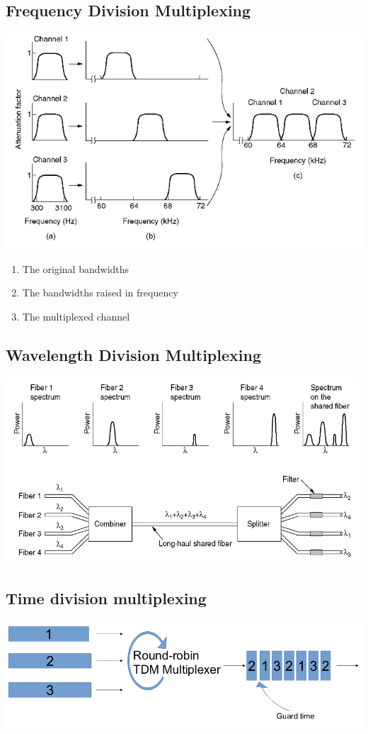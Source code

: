 \documentclass{article}[18pt]
\begin{document}
\subsection{Frequency Division Multiplexing}
\begin{center}
	\includegraphics[scale=0.7]{FDM}
\end{center}
\begin{enumerate}[label=\alph*]
	\item The original bandwidths
	\item The bandwidths raised in frequency
	\item The multiplexed channel
\end{enumerate}
\subsection{Wavelength Division Multiplexing}
\begin{center}
	\includegraphics[scale=0.7]{WDM}
\end{center}
\subsection{Time division multiplexing}
\begin{center}
	\includegraphics[scale=0.7]{TDM}
\end{center}
\end{document}
